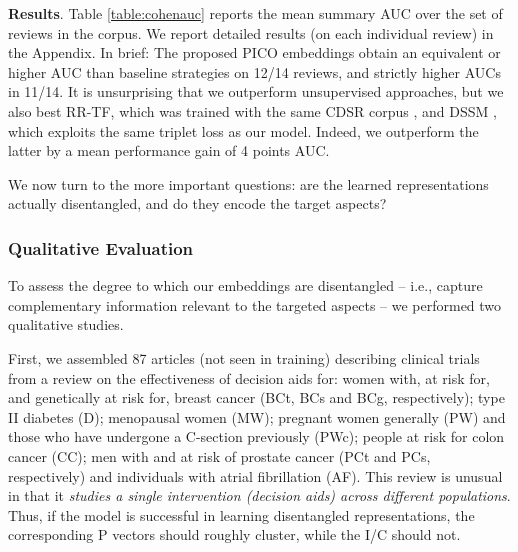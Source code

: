 \documentclass[11pt,a4paper]{article}
\begin{document}



\vspace{.15em}
\noindent \textbf{Results}. Table \ref{table:cohenauc} reports the mean summary AUC over the set of reviews in the  corpus. We report detailed results (on each individual review) in the Appendix. In brief: The proposed PICO embeddings obtain an equivalent or higher AUC than baseline strategies on 12/14 reviews, and strictly higher AUCs in 11/14. It is unsurprising that we outperform unsupervised approaches, but we also best RR-TF, which was trained with the same CDSR corpus \cite{wallace2016extracting}, and DSSM \cite{shen2014latent}, which exploits the same triplet loss as our model. Indeed, we outperform the latter by a mean performance gain of 4 points AUC. 

We now turn to the more important questions: are the learned representations actually disentangled, and do they encode the target aspects? 


\vspace{-.35em}
\subsubsection{Qualitative Evaluation} 
\vspace{-.25em}
To assess the degree to which our embeddings are disentangled -- i.e., capture complementary information relevant to the targeted aspects -- we performed two qualitative studies.

First, we assembled 87 articles (not seen in training) describing clinical trials from a review on the effectiveness of decision aids \cite{o2009decision} for: women with, at risk for, and genetically at risk for, breast cancer (BCt, BCs and BCg, respectively); type II diabetes (D); menopausal women (MW); pregnant women generally (PW) and those who have undergone a C-section previously (PWc); people at risk for colon cancer (CC); men with and at risk of prostate cancer (PCt and PCs, respectively) and individuals with atrial fibrillation (AF). This review is unusual in that it \emph{studies a single intervention (decision aids) across different populations}. Thus, if the model is successful in learning disentangled representations, the corresponding P vectors should roughly cluster, while the I/C should not. 
\end{document}

